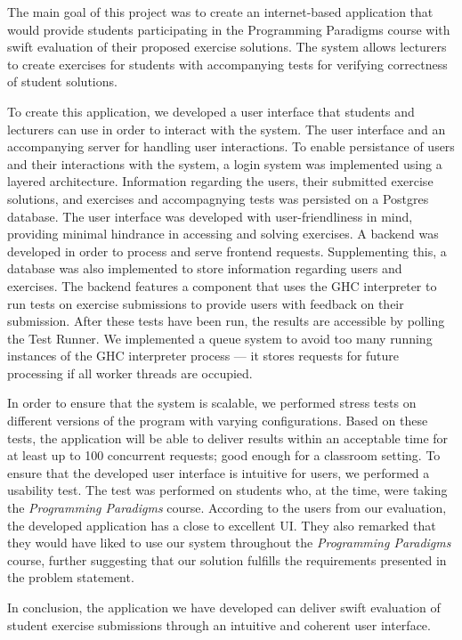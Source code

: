The main goal of this project was to create an internet-based application that would provide students participating in the Programming Paradigms course with swift evaluation of their proposed exercise solutions.
The system allows lecturers to create exercises for students with accompanying tests for verifying correctness of student solutions.

To create this application, we developed a user interface that students and lecturers can use in order to interact with the system. The user interface and an accompanying server for handling user interactions.
To enable persistance of users and their interactions with the system, a login system was implemented using a layered architecture.
Information regarding the users, their submitted exercise solutions, and exercises and accompagnying tests was persisted on a Postgres database.
The user interface was developed with user-friendliness in mind, providing minimal hindrance in accessing and solving exercises.
A backend was developed in order to process and serve frontend requests.
Supplementing this, a database was also implemented to store information regarding users and exercises.
The backend features a component that uses the GHC interpreter to run tests on exercise submissions to provide users with feedback on their submission.
After these tests have been run, the results are accessible by polling the Test Runner.
We implemented a queue system to avoid too many running instances of the GHC interpreter process --- it stores requests for future processing if all worker threads are occupied.

In order to ensure that the system is scalable, we performed stress tests on different versions of the program with varying configurations.
Based on these tests, the application will be able to deliver results within an acceptable time for at least up to 100 concurrent requests; good enough for a classroom setting.
To ensure that the developed user interface is intuitive for users, we performed a usability test.
The test was performed on students who, at the time, were taking the \textit{Programming Paradigms} course.
According to the users from our evaluation, the developed application has a close to excellent UI.
They also remarked that they would have liked to use our system throughout the \textit{Programming Paradigms} course, further suggesting that our solution fulfills the requirements presented in the problem statement.

In conclusion, the application we have developed can deliver swift evaluation of student exercise submissions through an intuitive and coherent user interface.